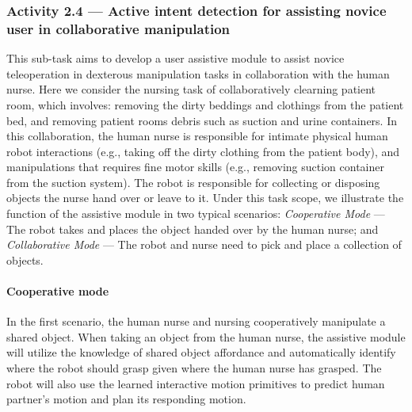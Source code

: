 \documentclass[letterpaper, 11 pt, onecolumn]{article}
\newcommand{\zhi}[1]{\textcolor{blue}{ZL: #1}}
\newcommand{\jie}[1]{\textcolor{green}{JF: #1}}
\begin{document}




\subsubsection{Activity 2.4 --- Active intent detection for assisting novice user in collaborative manipulation}\label{sec:plan-intent-ActiveIntent}
This sub-task aims to develop a user assistive module to assist novice teleoperation in dexterous manipulation tasks in collaboration with the human nurse. Here we consider the nursing task of collaboratively clearning patient room, which involves: removing the dirty beddings and clothings from the patient bed, and removing patient rooms debris such as suction and urine containers. In this collaboration, the human nurse is responsible for intimate physical human robot interactions (e.g., taking off the dirty clothing from the patient body), and manipulations that requires fine motor skills (e.g., removing suction container from the suction system). The robot is responsible for collecting or disposing objects the nurse hand over or leave to it. Under this task scope, we illustrate the function of the assistive module in two typical scenarios: \textit{Cooperative Mode} --- The robot takes and places the object handed over by the human nurse; and \textit{Collaborative Mode} --- The robot and nurse need to pick and place a collection of objects. 

\paragraph*{Cooperative mode} In the first scenario, the human nurse and nursing cooperatively manipulate a shared object. When taking an object from the human nurse, the assistive module will utilize the knowledge of shared object affordance and automatically identify where the robot should grasp given where the human nurse has grasped. The robot will also use the learned interactive motion primitives to predict human partner's motion and plan its responding motion. 
\end{document}
